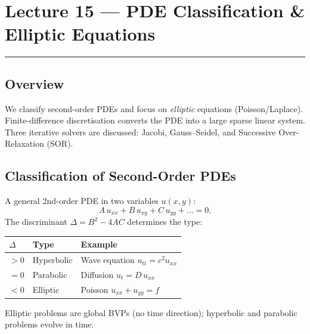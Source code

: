 
\section{Lecture 15 — PDE Classification \& Elliptic Equations}\label{sec:lec15}
\hrule\vspace{1.5em}

\subsection*{Overview}
We classify second-order PDEs and focus on \emph{elliptic} equations
(Poisson/Laplace).  Finite-difference discretisation converts the PDE
into a large sparse linear system.  Three iterative solvers are
discussed: Jacobi, Gauss–Seidel, and Successive Over-Relaxation (SOR).

\subsection{Classification of Second-Order PDEs}\label{subsec:lec15:class}

A general 2nd-order PDE in two variables $u(x,y)$:
\begin{equation}
  A\,u_{xx} + B\,u_{xy} + C\,u_{yy} + \ldots = 0.
  \label{eq:lec15:pde}
\end{equation}
The discriminant $\Delta = B^2 - 4AC$ determines the type:

\begin{center}
\begin{tabular}{lll}
\toprule
$\Delta$ & Type & Example \\
\midrule
$>0$ & Hyperbolic & Wave equation $u_{tt} = c^2 u_{xx}$ \\
$=0$ & Parabolic  & Diffusion $u_t = D\,u_{xx}$ \\
$<0$ & Elliptic   & Poisson $u_{xx}+u_{yy}=f$ \\
\bottomrule
\end{tabular}
\end{center}

Elliptic problems are global BVPs (no time direction); hyperbolic and
parabolic problems evolve in time.

